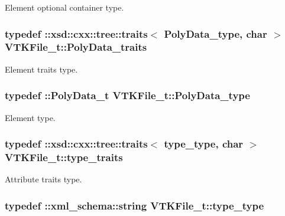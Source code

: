 Element optional container type. 

\hypertarget{classVTKFile__t_aa5ad98f5709c1e9beec3804a7f42b5f6}{
\subsubsection[{Poly\-Data\-\_\-traits}]{\setlength{\rightskip}{0pt plus 5cm}typedef \-::xsd\-::cxx\-::tree\-::traits$<$ {\bf Poly\-Data\-\_\-type}, char $>$ {\bf V\-T\-K\-File\-\_\-t\-::\-Poly\-Data\-\_\-traits}}}\label{classVTKFile__t_aa5ad98f5709c1e9beec3804a7f42b5f6}


Element traits type. 

\hypertarget{classVTKFile__t_a4588b4f0e28ba09aa219bda7e1fc6c97}{
\subsubsection[{Poly\-Data\-\_\-type}]{\setlength{\rightskip}{0pt plus 5cm}typedef \-::{\bf Poly\-Data\-\_\-t} {\bf V\-T\-K\-File\-\_\-t\-::\-Poly\-Data\-\_\-type}}}\label{classVTKFile__t_a4588b4f0e28ba09aa219bda7e1fc6c97}


Element type. 

\hypertarget{classVTKFile__t_aee4ac167e843e9def1be4f43ad930391}{
\subsubsection[{type\-\_\-traits}]{\setlength{\rightskip}{0pt plus 5cm}typedef \-::xsd\-::cxx\-::tree\-::traits$<$ {\bf type\-\_\-type}, char $>$ {\bf V\-T\-K\-File\-\_\-t\-::type\-\_\-traits}}}\label{classVTKFile__t_aee4ac167e843e9def1be4f43ad930391}


Attribute traits type. 

\hypertarget{classVTKFile__t_ac1f3484e4fde414849ede43a00955f76}{
\subsubsection[{type\-\_\-type}]{\setlength{\rightskip}{0pt plus 5cm}typedef \-::{\bf xml\-\_\-schema\-::string} {\bf V\-T\-K\-File\-\_\-t\-::type\-\_\-type}}}\label{classVTKFile__t_ac1f3484e4fde414849ede43a00955f76}


